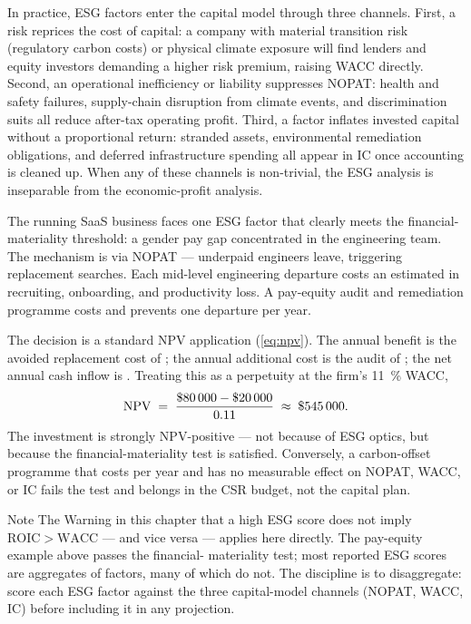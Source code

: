 In practice, ESG factors enter the capital model through three channels. First, a risk reprices
the cost of capital: a company with material transition risk (regulatory carbon costs) or
physical climate exposure will find lenders and equity investors demanding a higher risk premium,
raising WACC directly. Second, an operational inefficiency or liability suppresses NOPAT: health
and safety failures, supply-chain disruption from climate events, and discrimination suits all
reduce after-tax operating profit. Third, a factor inflates invested capital without a
proportional return: stranded assets, environmental remediation obligations, and deferred
infrastructure spending all appear in IC once accounting is cleaned up. When any of these
channels is non-trivial, the ESG analysis is inseparable from the economic-profit analysis.

\begin{example}
The running SaaS business faces one ESG factor that clearly meets the financial-materiality
threshold: a gender pay gap concentrated in the engineering team. The mechanism is via NOPAT ---
underpaid engineers leave, triggering replacement searches. Each mid-level engineering
departure costs an estimated  in recruiting, onboarding, and productivity loss.
A pay-equity audit and remediation programme costs  and prevents one departure per
year.

The decision is a standard NPV application (\cref{eq:npv}). The annual benefit is the avoided
replacement cost of ; the annual additional cost is the audit of ; the
net annual cash inflow is . Treating this as a perpetuity at the firm's \qty{11}{\percent}
WACC,
\[
  \mathrm{NPV} \;=\; \frac{\$\num{80000} - \$\num{20000}}{0.11} \;\approx\; \$\num{545000}.
\]
The investment is strongly NPV-positive --- not because of ESG optics, but because the
financial-materiality test is satisfied. Conversely, a carbon-offset programme that costs
 per year and has no measurable effect on NOPAT, WACC, or IC fails the test and
belongs in the CSR budget, not the capital plan.
\end{example}

\begin{admonition}{Note}
The Warning in this chapter that a high ESG score does not imply \(\mathrm{ROIC}>\mathrm{WACC}\)
--- and vice versa --- applies here directly. The pay-equity example above passes the financial-
materiality test; most reported ESG scores are aggregates of factors, many of which do not.
The discipline is to disaggregate: score each ESG factor against the three capital-model channels
(NOPAT, WACC, IC) before including it in any projection.
\end{admonition}

